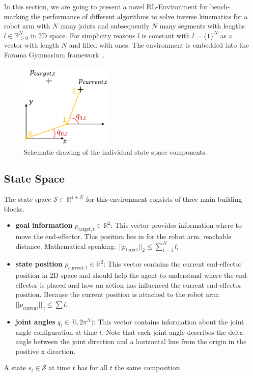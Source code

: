 In this section, we are going to present a novel RL-Environment for bench-marking the performance of different algorithms to solve inverse kinematics for a robot arm with $N$ many joints and subsequently $N$ many segments with lengths $l \in\mathbb{R}_{>0}^N$ in 2D space. For simplicity reasons $l$ is constant with $l = \{1\}^N$ as a vector with length $N$ and filled with ones. The environment is embedded into the Farama Gymnasium framework~\cite{Gymnasium}.

\begin{figure}[h]
    \centering
    \includegraphics[width=0.4\textwidth,]{figures/methodology/EnvExample.png}
    \caption[Plane Robot Environment]{Schematic drawing of the individual state space components.}
    \label{fig:plane_robot_env}
\end{figure}

\subsection{State Space}

The state space $\mathcal{S} \subset \mathbb{R}^{4 + N}$ for this environment consists of three main building blocks. 

\begin{itemize}
    \item \textbf{goal information} $p_{\text{target}, t} \in \mathbb{R}^2$: This vector provides information where to move the end-effector. This position lies in for the robot arm, reachable distance. Mathematical speaking: $||p_\text{target}||_2 \leq \sum_{i = 1}^N l_i$ 
    \item \textbf{state position} $p_{\text{current},t} \in \mathbb{R}^2$: This vector contains the current end-effector position in 2D space and should help the agent to understand where the end-effector is placed and how an action has influenced the current end-effector position. Because the current position is attached to the robot arm: $||p_\text{current}||_2 \leq \sum l$.
    \item \textbf{joint angles} $q_t \in [0, 2\pi^N)$: This vector contains information about the joint angle configuration at time $t$. Note that each joint angle describes the delta angle between the joint direction and a horizontal line from the origin in the positive x direction.
\end{itemize}
A state $s_t \in \mathcal{S}$ at time $t$ has for all $t$ the same composition

